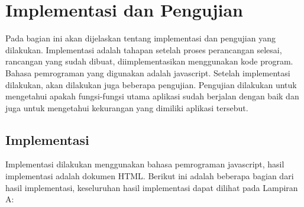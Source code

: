 \chapter{Implementasi dan Pengujian}
Pada bagian ini akan dijelaskan tentang implementasi dan pengujian yang
dilakukan. Implementasi adalah tahapan setelah proses perancangan selesai,
rancangan yang sudah dibuat, diimplementasikan menggunakan kode program. Bahasa
pemrograman yang digunakan adalah javascript. Setelah implementasi dilakukan,
akan dilakukan juga beberapa pengujian. Pengujian dilakukan untuk mengetahui
apakah fungsi-fungsi utama aplikasi sudah berjalan dengan baik dan
juga untuk mengetahui kekurangan yang dimiliki aplikasi tersebut.

\section{Implementasi}
Implementasi dilakukan menggunakan bahasa pemrograman javascript, hasil
implementasi adalah dokumen HTML. Berikut ini adalah beberapa bagian dari hasil
implementasi, keseluruhan hasil implementasi dapat dilihat pada Lampiran A:
